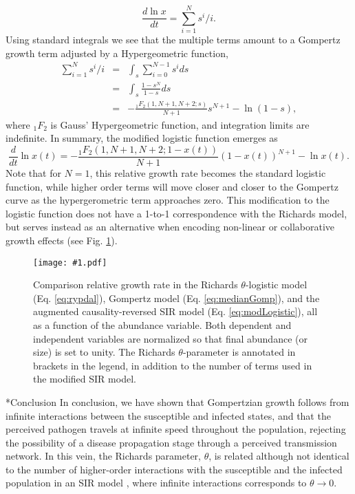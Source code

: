 \documentclass[sn-mathphys]{sn-jnl}%
\newcommand{\insertPdfFig}[3]{
  \begin{figure}[h]
  \centering
  \texttt{[image: \#1.pdf]}
  \caption{#2}
  \label{fig:#1}
  \end{figure}
}
\theoremstyle{thmstyleone}%
\theoremstyle{thmstyletwo}%
\theoremstyle{thmstylethree}%
\begin{document}
\begin{equation}
\frac{d \ln{x}}{dt} = \sum_{i=1}^N s^i/i.
\end{equation}
Using standard integrals we see that the multiple terms amount to a Gompertz growth term adjusted by a Hypergeometric function,
\begin{eqnarray*}
  \sum_{i=1}^N s^i/i &=& \int_s \sum_{i=0}^{N-1} s^i ds\\
  &=&\int_s \frac{1-s^N}{1-s} ds\\
  &=&- \frac{{}_{1}F_{2}({1,N+1,N+2;s})}{N+1}s^{N+1} - \ln(1-s),
\end{eqnarray*}
where ${}_1F_{2}$ is Gauss' Hypergeometric function, and integration limits are indefinite. In summary, the modified logistic function emerges as
 \begin{equation}
 \label{eq:modLogistic}
\frac{d}{dt}\ln{x(t)} = - \frac{{}_{1}F_{2}({1,N+1,N+2;1-x(t)})}{N+1}(1-x(t))^{N+1} - \ln{x(t)}.
 \end{equation}
 Note that for $N=1$, this relative growth rate becomes the standard logistic function, while higher order terms will move closer and closer to the Gompertz curve as the hypergerometric term approaches zero. This modification to the logistic function does not have a 1-to-1 correspondence with the Richards model, but serves instead as an alternative when encoding non-linear or collaborative growth effects (see Fig. \ref{fig:hypergeometric}).

\insertPdfFig{hypergeometric}{Comparison relative growth rate in the Richards $\theta$-logistic model (Eq. \ref{eq:rypdal}), Gompertz model (Eq. \ref{eq:medianGomp}), and the augmented causality-reversed SIR model (Eq. \ref{eq:modLogistic}), all as a function of the abundance variable. Both dependent and independent variables are normalized so that final abundance (or size) is set to unity. The Richards $\theta$-parameter is annotated in brackets in the legend, in addition to the number of terms used in the modified SIR model.} 


\section*{Conclusion}
In conclusion, we have shown that Gompertzian growth follows from infinite interactions between the susceptible and infected states, and that the perceived pathogen travels at infinite speed throughout the population, rejecting the possibility of a disease propagation stage through a perceived transmission network. In this vein, the Richards parameter, $\theta$, is related although not identical to the number of higher-order interactions with the susceptible and the infected population in an SIR model \cite{richards1959flexible}, where infinite interactions corresponds to $\theta\rightarrow 0$. 
\end{document}
